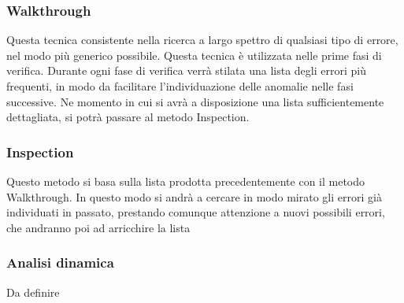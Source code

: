 		\subsubsection{Walkthrough}
		Questa tecnica consistente nella ricerca a largo spettro di qualsiasi tipo di errore, nel modo più generico possibile. 
		Questa tecnica è utilizzata nelle prime fasi di verifica. Durante ogni fase di verifica verrà stilata una lista degli errori più frequenti, in modo da facilitare l’individuazione delle anomalie nelle fasi successive. 
		Ne momento in cui si avrà a disposizione una lista sufficientemente dettagliata, si potrà passare al metodo Inspection.
		
		
		\subsubsection{Inspection}
		Questo metodo si basa sulla lista prodotta precedentemente con il metodo Walkthrough. In questo modo si andrà a cercare in modo mirato gli errori già individuati in passato, prestando comunque attenzione a nuovi possibili errori, che andranno poi ad arricchire la lista
		
		
		\subsubsection{Analisi dinamica}
		Da definire
		
		
	